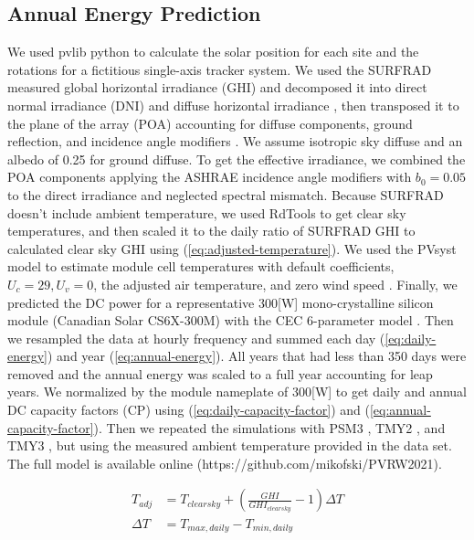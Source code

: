 \documentclass[conference]{IEEEtran}
\begin{document}
\subsection{Annual Energy Prediction}
We used pvlib python \cite{F.Holmgren2018} to calculate the solar position for each site and the rotations for a fictitious single-axis tracker system. We used the SURFRAD measured global horizontal irradiance (GHI) and decomposed it into direct normal irradiance (DNI) and diffuse horizontal irradiance \cite{ERBS1982293}, then transposed it to the plane of the array (POA) accounting for diffuse components, ground reflection, and incidence angle modifiers \cite{HayDavies}. We assume isotropic sky diffuse and an albedo of 0.25 for ground diffuse. To get the effective irradiance, we combined the POA components applying the ASHRAE incidence angle modifiers with $b_0=0.05$ to the direct irradiance and neglected spectral mismatch. Because SURFRAD doesn't include ambient temperature, we used RdTools \cite{Jordan2018} to get clear sky temperatures, and then scaled it to the daily ratio of SURFRAD GHI to calculated clear sky GHI \cite{Ineichen2002} using (\ref{eq:adjusted-temperature}). We used the PVsyst model to estimate module cell temperatures with default coefficients, $U_c=29, U_v=0$, the adjusted air temperature, and zero wind speed \cite{Faimain2008}. Finally, we predicted the DC power for a representative 300[W] mono-crystalline silicon module (Canadian Solar CS6X-300M) with the CEC 6-parameter model \cite{Dobos2012}. Then we resampled the data at hourly frequency and summed each day (\ref{eq:daily-energy}) and year (\ref{eq:annual-energy}). All years that had less than 350 days were removed and the annual energy was scaled to a full year accounting for leap years. We normalized by the module nameplate of 300[W] to get daily and annual DC capacity factors (CP) using (\ref{eq:daily-capacity-factor}) and (\ref{eq:annual-capacity-factor}). Then we repeated the simulations with PSM3 \cite{Habte2017}, TMY2 \cite{Marion1995}, and TMY3 \cite{Wilcox2012}, but using the measured ambient temperature provided in the data set. The full model is available online (https://github.com/mikofski/PVRW2021).

\begin{equation}
\begin{aligned}
T_{adj} &= T_{clearsky} + \left(\frac{GHI}{GHI_{clearsky}} - 1 \right)\Delta T \\
\Delta T &= T_{max,daily} - T_{min,daily} 
\end{aligned}
\label{eq:adjusted-temperature}
\end{equation}
\end{document}
